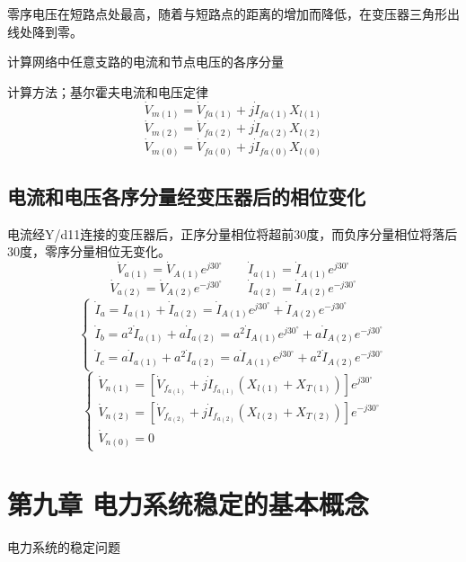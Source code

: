 \documentclass[UTF8, 12pt, a4paper]{ctexart}
\begin{document}
零序电压在短路点处最高，随着与短路点的距离的增加而降低，在变压器三角形出线处降到零。

计算网络中任意支路的电流和节点电压的各序分量

计算方法；基尔霍夫电流和电压定律
\[\dot { V } _ { m ( 1 ) } = \dot { V } _ { fa( 1 ) } +   j \dot { I } _ { fa( 1 ) }X _ { l ( 1 ) }\]
\[\dot { V } _ { m ( 2 ) } = \dot { V } _ { fa( 2 ) } +   j \dot { I } _ { fa( 2 ) }X _ { l ( 2 ) }\]
\[\dot { V } _ { m ( 0 ) } = \dot { V } _ { fa( 0 ) } +   j \dot { I } _ { fa( 0 ) }X _ { l ( 0 ) }\]
\subsection{电流和电压各序分量经变压器后的相位变化}
电流经Y/d11连接的变压器后，正序分量相位将超前30度，而负序分量相位将落后30度，零序分量相位无变化。
\[\dot { V } _ { a ( 1 ) } = \dot { V } _ { A ( 1 ) } e ^ { j 30 ^ { \circ } } \qquad \dot{I} _ { a ( 1 ) } = \dot { I } _ { A ( 1 ) } e ^ {j30 ^ { \circ } }\]
\[\dot { V } _ { a ( 2 ) } = \dot { V } _ { A ( 2 ) } e ^ { -j 30 ^ { \circ } } \qquad\dot{I }_ { a ( 2 ) } = \dot { I } _ { A ( 2 ) } e ^ {-j30 ^ { \circ } }\]
\[\begin{cases}
    \dot { I } _ { a } = I _ { a ( 1 ) } + \dot { I } _ { a ( 2 ) } = \dot { I } _ { A (1) } e ^ { j30 ^ { \circ } } + \dot { I } _ { A ( 2 ) } e ^ { - j30 ^ { \circ } }\\
    \dot { I } _ { b } =a^2 \dot {I} _ { a ( 1 ) } + a \dot { I } _ { a ( 2 ) } =a^2  \dot { I } _ { A (1) } e ^ { j30 ^ { \circ } } + a \dot { I } _ { A ( 2 ) } e ^ { - j30 ^ { \circ } }\\
    \dot { I } _ { c } = a \dot {I} _ { a ( 1 ) } + a^2 \dot { I } _ { a ( 2 ) } =a  \dot { I } _ { A (1) } e ^ { j30 ^ { \circ } } + a^2 \dot { I } _ { A ( 2 ) } e ^ { - j30 ^ { \circ } } 
\end{cases}
\]
\[
    \begin{cases}
        \dot { V } _ { n ( 1 ) } = [ \dot { V } _ { f _ { a ( 1 ) } } + j\dot { I} _ { f _ { a ( 1 ) } }( X _ { l( 1 ) } + X _ {T ( 1 ) } ) ] e ^ { j30  ^ { \circ }}\\
        \dot { V } _ { n ( 2 ) } = [ \dot { V } _ { f _ { a ( 2 ) } } + j\dot { I} _ { f _ { a ( 2 ) } }( X _ { l( 2 ) } + X _ {T ( 2 ) } ) ] e ^ { -j30  ^ { \circ }}\\
        \dot { V } _ {n(0)} = 0    
    \end{cases}
\]
\newpage{}
\section{第九章{} 电力系统稳定的基本概念}
电力系统的稳定问题
\end{document}
